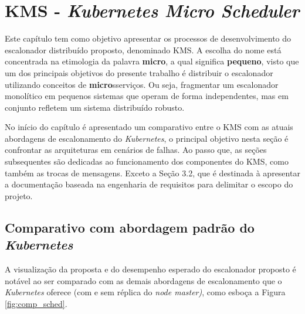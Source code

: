 \chapter{KMS - \textit{Kubernetes Micro Scheduler}\label{cap-proposta}}

Este capítulo tem como objetivo apresentar os processos de desenvolvimento do escalonador distribuído proposto, denominado \ac{KMS}. A escolha do nome está concentrada na etimologia da palavra \textbf{micro}, a qual significa \textbf{pequeno}, visto que um dos principais objetivos do presente trabalho é distribuir o escalonador utilizando conceitos de \textbf{micro}sserviços. Ou seja, fragmentar um escalonador monolítico em pequenos sistemas que operam de forma independentes, mas em conjunto refletem um sistema distribuído robusto.

No início do capítulo é apresentado um comparativo entre o \ac{KMS} com as atuais abordagens de escalonamento do \textit{Kubernetes}, o principal objetivo nesta seção é confrontar as arquiteturas em cenários de falhas. Ao passo que, as seções subsequentes são dedicadas ao funcionamento dos componentes do \ac{KMS}, como também as trocas de mensagens. Exceto a Seção 3.2, que é destinada à apresentar a documentação baseada na engenharia de requisitos para delimitar o escopo do projeto.



\section{Comparativo com abordagem padrão do \textit{Kubernetes}}
A visualização da proposta e do desempenho esperado do escalonador proposto é notável ao ser comparado com as demais abordagens de escalonamento que o \textit{Kubernetes} oferece (com e sem réplica do \textit{node master)}, como esboça a Figura \ref{fig:comp_sched}.

